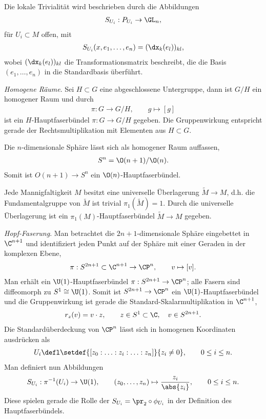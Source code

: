 \documentclass[%
	paper=a5,%
	fleqn,%
	DIV=18,%
	BCOR=0mm,
	fontsize=11pt,
	titlepage=false,%
	bibliography=totoc,
	DIV=18,%
	twoside=true,
	pdftitle=Riemannsche Geometrie,
	pdfauthor=Uwe Semmelmann,
	numbers=noendperiod]%
	{scrbook}
\begin{document}
\begin{ex}
\begin{exenum}
Die lokale Trivialität wird beschrieben durch die Abbildungen
\begin{align*}
S_{U_i}:P_{U_i} \to \GL_n,
\end{align*}
für $U_i\subset M$ offen, mit
\begin{align*}
S_{U_i}(x,e_1,\ldots,e_n) = (\dx_k(e_l))_{kl},
\end{align*}
wobei $(\dx_k(e_l))_{kl}$ die Transformationsmatrix beschreibt, die die
Basis $(e_1,\ldots,e_n)$ in die Standardbasis überführt.
\item \textit{Homogene Räume}. Sei $H\subset G$ eine abgeschlossene Untergruppe,
dann ist $G/H$ ein homogener Raum und durch
\begin{align*}
\pi: G\to G/H,\qquad g\mapsto [g]
\end{align*}
ist ein $H$-Hauptfaserbündel $\pi: G\to G/H$ gegeben. Die Gruppenwirkung
entspricht gerade der Rechtsmultiplikation mit Elementen aus $H\subset G$.
\item Die $n$-dimensionale Sphäre lässt sich als homogener Raum auffassen, 
\begin{align*}
S^n =\O(n+1)/\O(n).
\end{align*}
Somit ist $O(n+1)\to S^n$ ein $\O(n)$-Hauptfaserbündel.
\item Jede Mannigfaltigkeit $M$ besitzt eine universelle Überlagerung
$\tilde{M}\to M$, d.h. die Fundamentalgruppe von $\tilde{M}$ ist trivial
$\pi_1(\tilde{M}) = 1$. Durch die universelle Überlagerung ist  ein
$\pi_1(M)$-Hauptfaserbündel $\tilde{M}\to M$ gegeben.
\item \textit{Hopf-Faserung}. 
Man betrachtet die $2n+1$-dimensionale Sphäre eingebettet in $\C^{n+1}$ und
identifiziert jeden Punkt auf der Sphäre mit einer Geraden in der komplexen
Ebene,
\begin{align*}
\pi : S^{2n+1}\subset\C^{n+1}\to \CP^n,\qquad v\mapsto [v].
\end{align*}
Man erhält ein $\U(1)$-Hauptfaserbündel $\pi: S^{2n+1}\to \CP^n$; alle Fasern sind
diffeomorph zu $S^1\cong \U(1)$. Somit ist $S^{2n+1}\to \CP^n$ ein
$\U(1)$-Hauptfaserbündel und die Gruppenwirkung ist gerade die
Standard-Skalarmultiplikation in $\C^{n+1}$,
\begin{align*}
r_z(v) = v\cdot z,\qquad z\in S^1 \subset \C,\quad v\in S^{2n+1}.
\end{align*}
Die Standardüberdeckung von $\CP^n$ lässt sich in homogenen Koordinaten
ausdrücken als
\begin{align*}
U_i \defl \setdef{[z_0:\ldots:z_i:\ldots :z_n]}{z_i\neq 0},\qquad 0\le i\le n.
\end{align*}
Man definiert nun Abbildungen
\begin{align*}
S_{U_i} : \pi^{-1}(U_i) \to  \U(1),\qquad
(z_0,\ldots,z_n)\mapsto \frac{z_i}{\abs{z_i}},\qquad 0\le i\le n.
\end{align*}
Diese spielen gerade die Rolle der $S_{U_i}=\pr_2\circ \phi_{U_i}$ in der Definition des
Hauptfaserbündels.\bsp
\end{exenum}
\end{ex}
\end{document}
